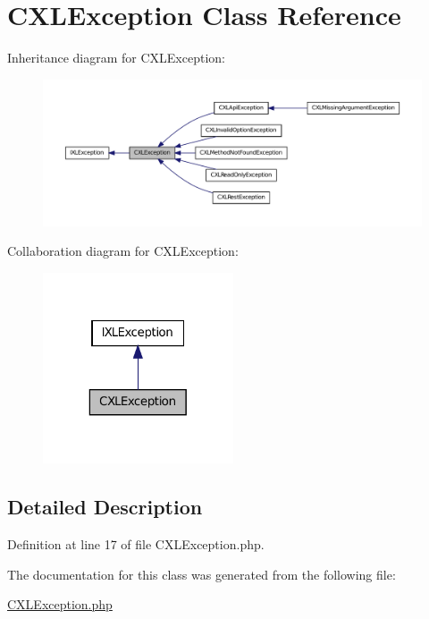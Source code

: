 \hypertarget{classCXLException}{
\section{CXLException Class Reference}
\label{classCXLException}
}


Inheritance diagram for CXLException:\nopagebreak
\begin{figure}[H]
\begin{center}
\leavevmode
\includegraphics[width=400pt]{classCXLException__inherit__graph}
\end{center}
\end{figure}


Collaboration diagram for CXLException:\nopagebreak
\begin{figure}[H]
\begin{center}
\leavevmode
\includegraphics[width=160pt]{classCXLException__coll__graph}
\end{center}
\end{figure}


\subsection{Detailed Description}


Definition at line 17 of file CXLException.php.



The documentation for this class was generated from the following file:\begin{DoxyCompactItemize}
\item 
\hyperlink{CXLException_8php}{CXLException.php}\end{DoxyCompactItemize}
